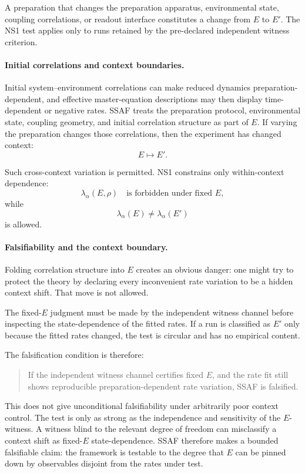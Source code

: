 \documentclass[aps,prx,onecolumn,11pt]{revtex4-2}
\theoremstyle{plain}
\theoremstyle{definition}
\theoremstyle{remark}
\begin{document}
A preparation that changes the preparation apparatus, environmental
state, coupling correlations, or readout interface constitutes a change
from \(E\) to \(E'\). The NS1 test applies only to runs retained by the
pre-declared independent witness criterion.

\paragraph{Initial correlations and context boundaries.}

Initial system--environment correlations can make reduced dynamics
preparation-dependent, and effective master-equation descriptions may
then display time-dependent or negative rates. SSAF treats the
preparation protocol, environmental state, coupling geometry, and
initial correlation structure as part of \(E\). If varying the
preparation changes those correlations, then the experiment has changed
context:
\[
E\longmapsto E'.
\]

Such cross-context variation is permitted. NS1 constrains only
within-context dependence:
\[
\lambda_\alpha(E,\rho)
\quad\text{is forbidden under fixed }E,
\]
while
\[
\lambda_\alpha(E)\neq\lambda_\alpha(E')
\]
is allowed.

\paragraph{Falsifiability and the context boundary.}

Folding correlation structure into \(E\) creates an obvious danger:
one might try to protect the theory by declaring every inconvenient
rate variation to be a hidden context shift. That move is not allowed.

The fixed-\(E\) judgment must be made by the independent witness
channel before inspecting the state-dependence of the fitted rates.
If a run is classified as \(E'\) only because the fitted rates changed,
the test is circular and has no empirical content.

The falsification condition is therefore:

\begin{quote}
If the independent witness channel certifies fixed \(E\), and the rate
fit still shows reproducible preparation-dependent rate variation, SSAF
is falsified.
\end{quote}

This does not give unconditional falsifiability under arbitrarily poor
context control. The test is only as strong as the independence and
sensitivity of the \(E\)-witness. A witness blind to the relevant
degree of freedom can misclassify a context shift as fixed-\(E\)
state-dependence. SSAF therefore makes a bounded falsifiable claim:
the framework is testable to the degree that \(E\) can be pinned down
by observables disjoint from the rates under test.
\end{document}
